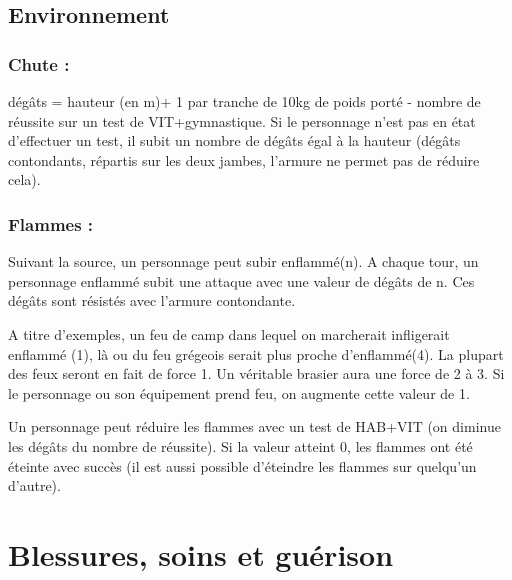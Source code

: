 \documentclass[10pt,a4paper,twocolumn]{book}
\begin{document}
\subsection{Environnement}
\subsubsection{Chute :}
dégâts = hauteur (en m)+ 1 par tranche de 10kg de poids porté - nombre de réussite sur un test de VIT+gymnastique. Si le personnage n’est pas en état d’effectuer un test, il subit un nombre de dégâts égal à la hauteur (dégâts contondants, répartis sur les deux jambes, l'armure ne permet pas de réduire cela).
\subsubsection{Flammes :}
Suivant la source, un personnage peut subir enflammé(n). A chaque tour, un personnage enflammé subit une attaque avec une valeur de dégâts de n. Ces dégâts sont résistés avec l'armure contondante.

A titre d’exemples, un feu de camp dans lequel on marcherait infligerait enflammé (1), là ou du feu grégeois serait plus proche d’enflammé(4).
La plupart des feux seront en fait de force 1. Un véritable brasier aura une force de 2 à 3. Si le personnage ou son équipement prend feu, on augmente cette valeur de 1.


Un personnage peut réduire les flammes avec un test de HAB+VIT (on diminue les dégâts du nombre de réussite). Si la valeur atteint 0, les flammes ont été éteinte avec succès (il est aussi possible d’éteindre les flammes sur quelqu’un d’autre).
\section{Blessures, soins et guérison}
\end{document}
